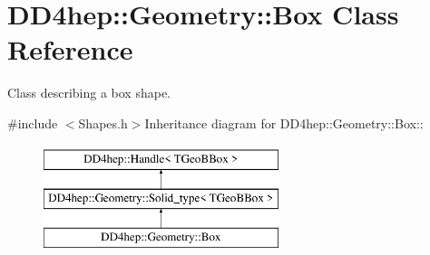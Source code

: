 \hypertarget{class_d_d4hep_1_1_geometry_1_1_box}{
\section{DD4hep::Geometry::Box Class Reference}
\label{class_d_d4hep_1_1_geometry_1_1_box}
}


Class describing a box shape.  


{\ttfamily \#include $<$Shapes.h$>$}Inheritance diagram for DD4hep::Geometry::Box::\begin{figure}[H]
\begin{center}
\leavevmode
\includegraphics[height=3cm]{class_d_d4hep_1_1_geometry_1_1_box}
\end{center}
\end{figure}
